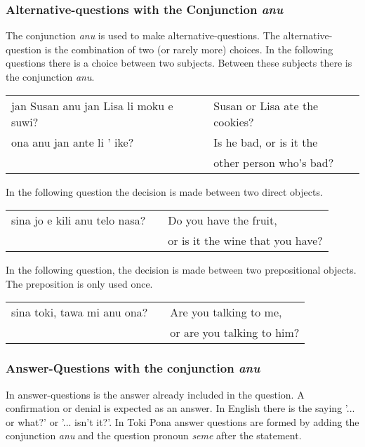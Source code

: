 %
\subsubsection*{Alternative-questions with the Conjunction \textit{anu}}
%
%
The conjunction \textit{anu} is used to make alternative-questions.
The alternative-question is the combination of two (or rarely more) choices.
In the following questions there is a choice between two subjects.
Between these subjects there is the conjunction \textit{anu}.

\begin{supertabular}{p{5,5cm}|ll}
    jan Susan anu jan Lisa li moku e suwi? &  & Susan or Lisa ate the cookies? \\
    ona anu jan ante li ' ike?             &  & Is he bad, or is it the        \\ && other person who's bad? \\
\end{supertabular}

In the following question the decision is made between two direct objects.

\begin{supertabular}{p{5,5cm}|ll}
    sina jo e kili anu telo nasa? &  & Do you have the fruit, \\ && or is it the wine that you have? \\
\end{supertabular}

In the following question, the decision is made between two prepositional objects.
The preposition is only used once.

\begin{supertabular}{p{5,5cm}|ll}
    sina toki, tawa mi anu ona? &  & Are you talking to me, \\ && or are you talking to him? \\
\end{supertabular}

%
\subsubsection*{Answer-Questions with the conjunction \textit{anu}}
%
%
In answer-questions is the answer already included in the question.
A confirmation or denial is expected as an answer.
In English there is the saying '... or what?' or '... isn't it?'.
In Toki Pona answer questions are formed by adding the conjunction \textit{anu} and the question pronoun \textit{seme} after the statement.

